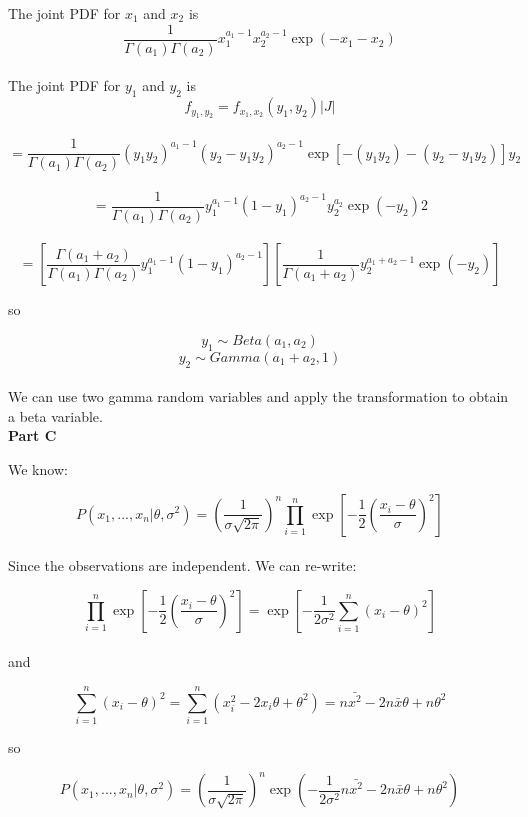 \documentclass[12pt]{amsart}
\begin{document}
 The joint PDF for $x_1$ and $x_2$ is \\
 
 $$\frac{1}{\Gamma(a_1)\Gamma(a_2)} x_1^{a_1-1} x_2^{a_2-1} \exp(-x_1-x_2)    $$\\
 
  The joint PDF for $y_1$ and $y_2$ is \\
  
  $$f_{y_1, y_2} = f_{x_1, x_2}(y_1, y_2) |J| $$\\
  
  $$  = \frac{1}{\Gamma(a_1)\Gamma(a_2)} (y_1 y_2)^{a_1-1} (y_2-y_1 y_2)^{a_2-1} \exp[-(y_1 y_2)-(y_2-y_1 y_2)]y_2 $$\\
  
  $$=   \frac{1}{\Gamma(a_1)\Gamma(a_2)} y_1^{a_1-1}(1-y_1)^{a_2-1}y_2^{a_2}\exp(-y_2)2 $$\\


$$ =   \left[\frac{\Gamma(a_1 + a_2)}{\Gamma(a_1)\Gamma(a_2)}y_1^{a_1-1}(1-y_1)^{a_2-1} \right] \left[ \frac{1}{\Gamma(a_1 + a_2)}y_2^{a_1+a_2-1}\exp(-y_2)  \right] $$


so 

$$ y_1 \sim Beta(a_1, a_2)$$
$$ y_2 \sim Gamma(a_1+a_2, 1)$$\\

We can use two gamma random variables and apply the transformation to obtain a beta variable.\\ 

{\bf Part C} \\
\bigskip

We know:

$$P(x_1, ...,x_n|\theta, \sigma^2) = \left(\frac{1}{\sigma \sqrt{2\pi }}\right)^n \prod_{i=1}^{n} \exp\left[-\frac{1}{2}\left(\frac{x_i-\theta}{\sigma}\right)^2\right]$$\\

Since the observations are independent. We can re-write:

$$ \prod_{i=1}^{n} \exp\left[-\frac{1}{2}\left(\frac{x_i-\theta}{\sigma}\right)^2\right] =  \exp\left[-\frac{1}{2\sigma^2}\sum_{i=1}^{n}(x_i-\theta)^2\right]     $$\\

and 

$$\sum_{i=1}^{n}(x_i-\theta)^2 =  \sum_{i=1}^{n} (x_i^2 - 2x_i\theta + \theta^2 ) = n\bar{x^2} - 2n\bar{x}\theta +n\theta^2 $$

so



$$P(x_1, ...,x_n|\theta, \sigma^2) = \left(\frac{1}{\sigma \sqrt{2\pi }}\right)^n \exp\left(-\frac{1}{2\sigma^2}n\bar{x^2} - 2n\bar{x}\theta +n\theta^2\right)$$\\
\end{document}
